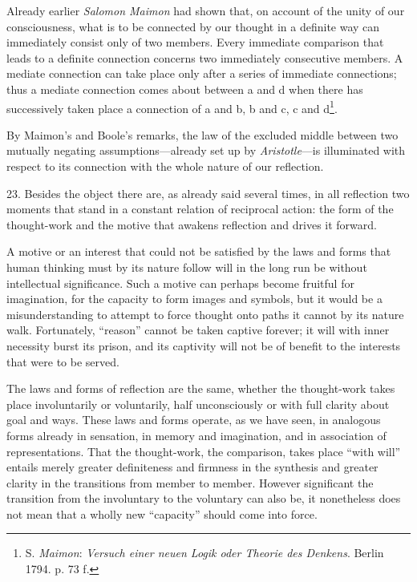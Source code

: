 \documentclass[12pt,a4paper]{book}
\newcommand{\opage}[1]{\marginnote{\footnotesize\textit{[#1]}}}
\begin{document}
Already earlier \emph{Salomon Maimon} had shown that, on account of the
unity of our consciousness, what is to be connected by our thought in a
definite way can immediately consist only of two members. Every immediate
comparison that leads to a definite connection concerns two immediately
consecutive members. A mediate connection can take place only after a
series of immediate connections; thus \opage{69}a mediate connection comes about
between a and d when there has successively taken place a connection of a
and b, b and c, c and d\footnote{S. \emph{Maimon}: \emph{Versuch einer
neuen Logik oder Theorie des Denkens}. Berlin 1794. p. 73 f.}.

By Maimon's and Boole's remarks, the law of the excluded middle between
two mutually negating assumptions---already set up by
\emph{Aristotle}---is illuminated with respect to its connection with the
whole nature of our reflection.

23. Besides the object there are, as already said several times, in all
reflection two moments that stand in a constant relation of reciprocal
action: the form of the thought-work and the motive that awakens
reflection and drives it forward.

A motive or an interest that could not be satisfied by the laws and forms
that human thinking must by its nature follow will in the long run be
without intellectual significance. Such a motive can perhaps become
fruitful for imagination, for the capacity to form images and symbols, but
it would be a misunderstanding to attempt to force thought onto paths it
cannot by its nature walk. Fortunately, ``reason'' cannot be taken captive
forever; it will with inner necessity burst its prison, and its captivity
will not be of benefit to the interests that were to be served.

The laws and forms of reflection are the same, whether the thought-work
takes place involuntarily or voluntarily, half unconsciously or with full
clarity about goal and ways. These laws and forms operate, as we have seen,
in analogous forms already in sensation, in memory and imagination, and in
association of representations. That the thought-work, the comparison,
takes place ``with will'' entails merely greater definiteness and firmness
in the synthesis and greater clarity in the transitions from member to
member. However significant the transition from the involuntary to the
voluntary can also be, it nonetheless does not mean that a wholly new
``capacity'' should come into force.
\end{document}
